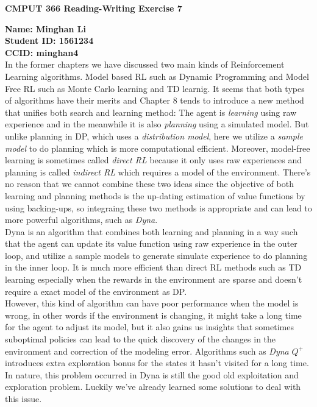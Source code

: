 \documentclass[12pt,a4paper]{article}
\begin{document}
\centerline{\large{\textbf{CMPUT 366 Reading-Writing Exercise 7}}}
\noindent \textbf{Name: Minghan Li}\\
\textbf{Student ID: 1561234}\\
\textbf{CCID: minghan4}\\

In the former chapters we have discussed two main kinds of Reinforcement Learning algorithms. Model based RL such as Dynamic Programming and Model Free RL such as Monte Carlo learning and TD learnig. It seems that both types of algorithms have their merits and Chapter 8 tends to introduce a new method that unifies both search and learning method: The agent is \textit{learning} using raw experience and in the meanwhile it is also \textit{planning} using a simulated model. But unlike planning in DP, which uses a \textit{distribution model}, here we utilize a \textit{sample model} to do planning which is more computational efficient. Moreover, model-free learning is sometimes called \textit{direct RL} because it only uses raw experiences and planning is called \textit{indirect RL} which requires a model of the environment. There's no reason that we cannot combine these two ideas since the objective of both learning and planning methods is the up-dating estimation of value functions by using backing-ups, so integraing these two methods is appropriate and can lead to more powerful algorithms, such as \textit{Dyna}.\\

Dyna is an algorithm that combines both learning and planning in a way such that the agent can update its value function using raw experience in the outer loop, and utilize a sample models to generate simulate experience to do planning in the inner loop. It is much more efficient than direct RL methods such as TD learning especially when the rewards in the environment are sparse and doesn't require a exact model of the environment as DP.\\

However, this kind of algorithm can have poor performance when the model is wrong, in other words if the environment is changing, it might take a long time for the agent to adjust its model, but it also gains us insights that sometimes suboptimal policies can lead to the quick discovery of the changes in the environment and correction of the modeling error. Algorithms such as \textit{Dyna} $Q^+$ introduces extra exploration bonus for the states it hasn't visited for a long time. In nature, this problem occurred in Dyna is still the good old exploitation and exploration problem. Luckily we've already learned some solutions to deal with this issue.\\
\end{document}
